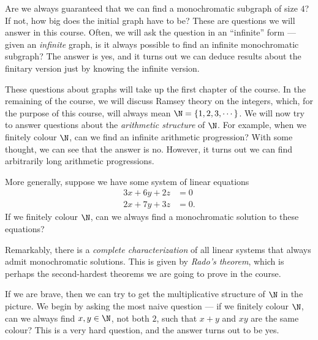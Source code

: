 \documentclass[a4paper]{article}
\begin{document}
\begin{center}
\end{center}
Are we always guaranteed that we can find a monochromatic subgraph of size $4$? If not, how big does the initial graph have to be? These are questions we will answer in this course. Often, we will ask the question in an ``infinite'' form --- given an \emph{infinite} graph, is it always possible to find an infinite monochromatic subgraph? The answer is yes, and it turns out we can deduce results about the finitary version just by knowing the infinite version.

These questions about graphs will take up the first chapter of the course. In the remaining of the course, we will discuss Ramsey theory on the integers, which, for the purpose of this course, will always mean $\N = \{1, 2, 3, \cdots\}$. We will now try to answer questions about the \emph{arithmetic structure} of $\N$. For example, when we finitely colour $\N$, can we find an infinite arithmetic progression? With some thought, we can see that the answer is no. However, it turns out we can find arbitrarily long arithmetic progressions.

More generally, suppose we have some system of linear equations
\begin{align*}
  3x + 6y + 2z &= 0\\
  2x + 7y + 3z &= 0.
\end{align*}
If we finitely colour $\N$, can we always find a monochromatic solution to these equations? 

Remarkably, there is a \emph{complete characterization} of all linear systems that always admit monochromatic solutions. This is given by \emph{Rado's theorem}, which is perhaps the second-hardest theorems we are going to prove in the course.

If we are brave, then we can try to get the multiplicative structure of $\N$ in the picture. We begin by asking the most naive question --- if we finitely colour $\N$, can we always find $x, y \in \N$, not both $2$, such that $x + y$ and $xy$ are the same colour? This is a very hard question, and the answer turns out to be yes.
\end{document}
